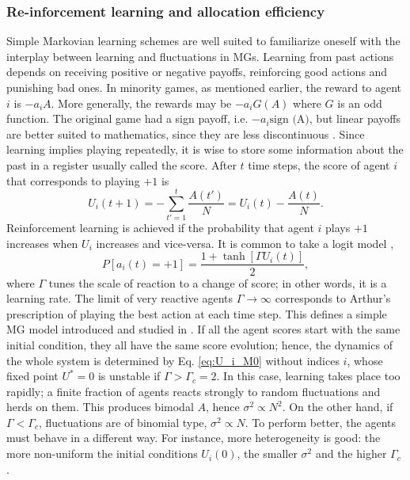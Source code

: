 \documentclass[aps,twocolumn,nofootinbib,sortedaddress,reprint]{revtex4-1}
\begin{document}
\subsubsection{Re-inforcement learning and allocation efficiency}
\label{sec:mg_P1}
Simple Markovian learning schemes are well suited to familiarize
oneself with the interplay between learning and fluctuations in MGs.
Learning from past actions depends on receiving positive or negative
payoffs, reinforcing good actions and punishing bad ones.  In minority
games, as mentioned earlier, the reward to agent $i$ is $-a_{i}A$. More generally,
  the rewards may be $-a_iG(A)$ where $G$ is an odd function. The original
  game had a sign payoff, i.e. $-a_i\textrm{sign (A)}$, but linear
  payoffs are better suited to mathematics, since they are less
  discontinuous \cite{Oxf1,CMZe00}. Since learning implies playing
repeatedly, it is wise to store some information about the past in a
register usually called the score. After $t$ time steps, the score of
agent $i$ that corresponds to playing $+1$ is
\begin{equation}\label{eq:U_i_M0}
U_{i}(t+1)=-\sum_{t'=1}^{t}\frac{A(t')}{N}=U_{i}(t)-\frac{A(t)}{N}.
\end{equation}
Reinforcement learning is achieved if the probability that agent $i$
plays $+1$ increases when $U_{i}$ increases and vice-versa. It is
common to take a logit model \cite{McFadden},
\begin{equation}\label{eq:PplusP1}
P[a_{i}(t)=+1]=\frac{1+\tanh[\Gamma U_{i}(t)]}{2},
\end{equation}
where $\Gamma$ tunes the scale of reaction to a change of score; in
other words, it is a learning rate. The limit of very reactive agents
$\Gamma\to\infty$ corresponds to Arthur's prescription of playing the
best action at each time step. This defines a simple MG model
introduced and studied in
\textcite{MC00,MarsiliMinMaj,mosetti2006minority,CAM08}. If all the agent scores
start with the same initial condition, they all have the same score
evolution; hence, the dynamics of the whole system is determined by
Eq. \eqref{eq:U_i_M0} without indices $i$,  whose fixed point $U^*=0$ is unstable if $\Gamma>\Gamma_c=2$. In this case, learning takes place too rapidly; a
finite fraction of agents reacts strongly to random fluctuations and
herds on them. This produces bimodal $A$, hence $\sigma^ 2\propto
N^2$. On the other hand, if $\Gamma<\Gamma_c$, fluctuations are of
binomial type, $\sigma^2\propto N$.  To perform better, the agents must
behave in a different way. For instance, more heterogeneity is good: the more non-uniform the initial conditions $U_i(0)$, the smaller $\sigma^2$ and the higher $\Gamma_c$ \cite{MarsiliMinMaj}.
\end{document}
